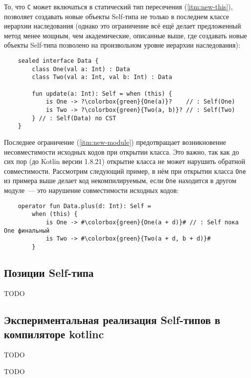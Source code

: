 То, что \texttt{C} может включаться в статический тип пересечения (\ref{itm:new-this}), позволяет создавать новые объекты Self-типа не только в последнем классе иерархии наследования (однако это ограничение всё ещё делает предложенный метод менее мощным, чем академические, описанные выше, где создавать новые объекты Self-типа позволено на произвольном уровне иерархии наследования):

\begin{verbatim}
    sealed interface Data {
        class One(val a: Int) : Data
        class Two(val a: Int, val b: Int) : Data

        fun update(a: Int): Self = when (this) {
            is One -> ?\colorbox{green}{One(a)}?    // : Self(One)
            is Two -> ?\colorbox{green}{Two(a, b)}? // : Self(Two)
        } // : Self(Data) по CST
    }
\end{verbatim}

Последнее ограничение (\ref{itm:new-module}) предотвращает возникновение несовместимости исходных кодов при открытии класса.
Это важно, так как до сих пор (до Kotlin версии 1.8.21) открытие класса не может нарушить обратной совместимости.
Рассмотрим следующий пример, в нём при открытии класса \texttt{One} из примера выше делает код некомпилируемым, если \texttt{One} находится в другом модуле~--- это нарушение совместимости исходных кодов:

\begin{verbatim}
    operator fun Data.plus(d: Int): Self =
        when (this) {
            is One -> #\colorbox{green}{One(a + d)}# // : Self пока One финальный
            is Two -> #\colorbox{green}{Two(a + d, b + d)}#
        }
\end{verbatim}


\subsection{Позиции Self-типа} \label{subsec:self-positions}

TODO %


\subsection{Экспериментальная реализация Self-типов в компиляторе kotlinc}

TODO %

TODO %
